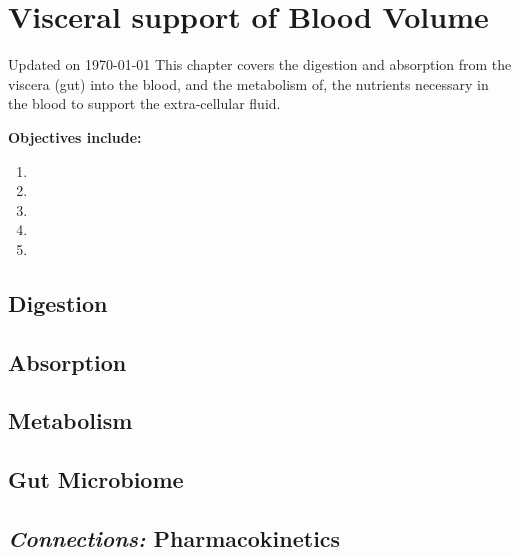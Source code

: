\chapter{Visceral support of Blood Volume}\label{chp:blood_nutrients}
Updated on \today
\minitoc
This chapter covers the digestion and absorption from the viscera (gut) into the blood, and the metabolism of, the nutrients necessary in the blood to support the extra-cellular fluid. 

\vspace{5mm}

\textbf{Objectives include:}
\begin{enumerate}
    \item
    \item
    \item
    \item
    \item
\end{enumerate}

\section{Digestion}

\section{Absorption}

\section{Metabolism}

\section{Gut Microbiome}

\section{\textit{Connections:} Pharmacokinetics}

\printbibliography[heading=subbibintoc]
